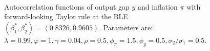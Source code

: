 \begin{figure}
    \begin{center}
        \mbox{\quad
        }
   \end{center}
   \caption{\label{aftrexp} Autocorrelation functions of output gap $y$ and inflation $\pi$ with forward-looking Taylor rule at the BLE $(\beta_1^*,
   \beta_2^*)=(0.8326, 0.9605)$. Parameters are: $\lambda=0.99, \varphi=1, \gamma=0.04, \rho=0.5, \phi_\pi=1.5,\phi_y=0.5, \sigma_{2}/\sigma_1=0.5$. }
    \end{figure}



